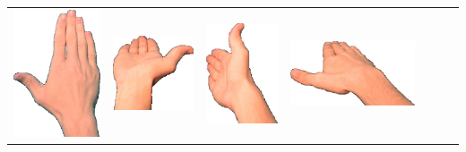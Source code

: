 \documentclass{article}
\begin{document}
\begin{center}
\begin{tabular}{r*{6}{c}}
\includegraphics[scale=0.1]{images/05-12-3.jpg}&
\includegraphics[scale=0.1]{images/05-12-4.jpg}&
\includegraphics[scale=0.1]{images/05-12-5.jpg}&
\includegraphics[scale=0.1]{images/05-12-6.jpg}\\

\end{tabular}
\end{center}
\end{document}
